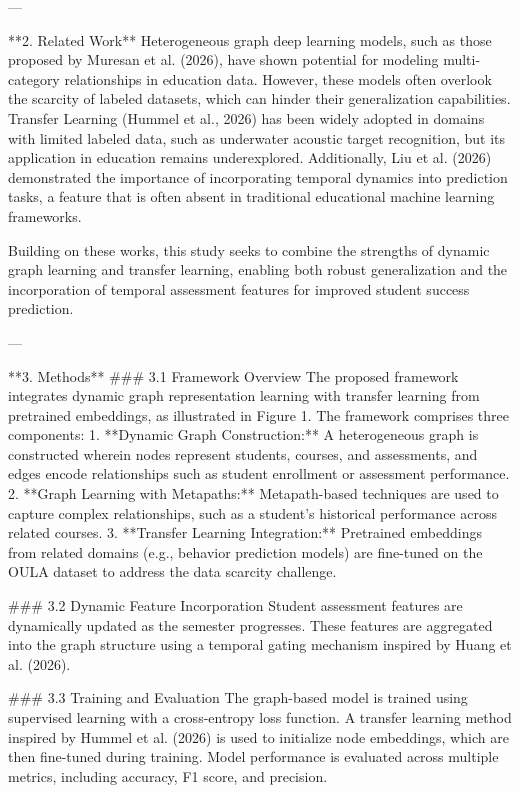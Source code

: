 ---

**2. Related Work**  
Heterogeneous graph deep learning models, such as those proposed by Muresan et al. (2026), have shown potential for modeling multi-category relationships in education data. However, these models often overlook the scarcity of labeled datasets, which can hinder their generalization capabilities. Transfer Learning (Hummel et al., 2026) has been widely adopted in domains with limited labeled data, such as underwater acoustic target recognition, but its application in education remains underexplored. Additionally, Liu et al. (2026) demonstrated the importance of incorporating temporal dynamics into prediction tasks, a feature that is often absent in traditional educational machine learning frameworks. 

Building on these works, this study seeks to combine the strengths of dynamic graph learning and transfer learning, enabling both robust generalization and the incorporation of temporal assessment features for improved student success prediction.

---

**3. Methods**  
### 3.1 Framework Overview  
The proposed framework integrates dynamic graph representation learning with transfer learning from pretrained embeddings, as illustrated in Figure 1. The framework comprises three components:  
1. **Dynamic Graph Construction:** A heterogeneous graph is constructed wherein nodes represent students, courses, and assessments, and edges encode relationships such as student enrollment or assessment performance.  
2. **Graph Learning with Metapaths:** Metapath-based techniques are used to capture complex relationships, such as a student's historical performance across related courses.  
3. **Transfer Learning Integration:** Pretrained embeddings from related domains (e.g., behavior prediction models) are fine-tuned on the OULA dataset to address the data scarcity challenge.  

### 3.2 Dynamic Feature Incorporation  
Student assessment features are dynamically updated as the semester progresses. These features are aggregated into the graph structure using a temporal gating mechanism inspired by Huang et al. (2026).  

### 3.3 Training and Evaluation  
The graph-based model is trained using supervised learning with a cross-entropy loss function. A transfer learning method inspired by Hummel et al. (2026) is used to initialize node embeddings, which are then fine-tuned during training. Model performance is evaluated across multiple metrics, including accuracy, F1 score, and precision.


